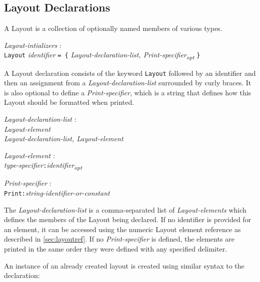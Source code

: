 \documentclass{article}
\begin{document}
\subsection{Layout Declarations}
A Layout is a collection of optionally named members of various types.
\begin{tabbing}
	\= \emph{Layout}\=\emph{-intializers} : \\
		\> \> \texttt{Layout} \emph{identifier} \texttt{= \{} \emph{Layout-declaration-list, Print-specifier\textsubscript{opt}} \texttt{\}}
\end{tabbing}
A Layout declaration consists of the keyword \texttt{Layout} followed by an identifier and then an assignment from a  \emph{Layout-declaration-list} surrounded by curly braces. It is also optional to define a \emph{Print-specifier}, which is a string that defines how this Layout should be formatted when printed.
\begin{tabbing}
	\= \emph{Layout}\=\emph{-declaration-list} : \\
		\> \> \emph{Layout-element} \\
		\>\> \emph{Layout-declaration-list, Layout-element}
\end{tabbing}
\begin{tabbing}
	\= \emph{Layout}\=\emph{-element} : \\
		\> \> \emph{type-specifier}\texttt{:}\emph{identifier\textsubscript{opt}}
\end{tabbing}
\begin{tabbing}
	\= \emph{Print}\=\emph{-specifier} : \\
		\> \> \texttt{Print:}\emph{string-identifier-or-constant}
\end{tabbing}
The \emph{Layout-declaration-list} is a comma-separated list of \emph{Layout-elements} which defines the members of the Layout being declared. If no identifier is provided for an element, it can be accessed using the numeric Layout element reference as described in \ref{sec:layoutref}. If no \emph{Print-specifier} is defined, the elements are printed in the same order they were defined with any specified delimiter.

An instance of an already created layout is created using similar syntax to the declaration:
\end{document}
